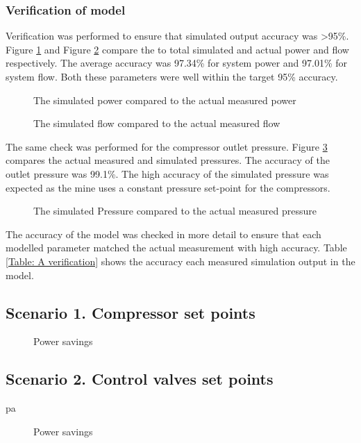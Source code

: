 \subsubsection{Verification of model}
Verification was performed to ensure that simulated output accuracy was >95\%. Figure \ref{fig: Verification Power Beatrix} and Figure \ref{fig: Verification Flow Beatrix} compare the to total simulated and actual power and flow respectively. The average accuracy was 97.34\% for system power and  97.01\% for system flow. Both these parameters were well within the target 95\% accuracy.
\begin{figure}[h]
	\centering
	
	\caption{The simulated power compared to the actual measured power}
	\label{fig: Verification Power Beatrix}
\end{figure}

\begin{figure}[h]
	\centering
	
	\caption{The simulated flow compared to the actual measured flow}
	\label{fig: Verification Flow Beatrix}
\end{figure}
The same check was performed for the compressor outlet pressure. Figure \ref{fig: Verification Pressure Beatrix} compares the actual measured and simulated pressures. The accuracy of the outlet pressure was 99.1\%. The high accuracy of the simulated pressure was expected as the mine uses a constant pressure set-point for the compressors.
\begin{figure}[h]
	\centering
	
	\caption{The simulated Pressure compared to the actual measured pressure}
	\label{fig: Verification Pressure Beatrix}
\end{figure}
\par
The accuracy of the model was checked in more detail to ensure that each modelled parameter matched the actual measurement with high accuracy. Table \ref{Table: A verification} shows the accuracy each measured simulation output in the model. 
\subsection{Scenario 1. Compressor set points}
\begin{figure}[h!]
	\centering
	
	\caption{Power savings}
	\label{fig: CompSetpoints Results Beatrix}
\end{figure}
\subsection{Scenario 2. Control valves set points}
\gls{pa}
\begin{figure}[h!]
	\centering
	
	\caption{Power savings}
	\label{fig: Control Valve Results Beatrix}
\end{figure}
